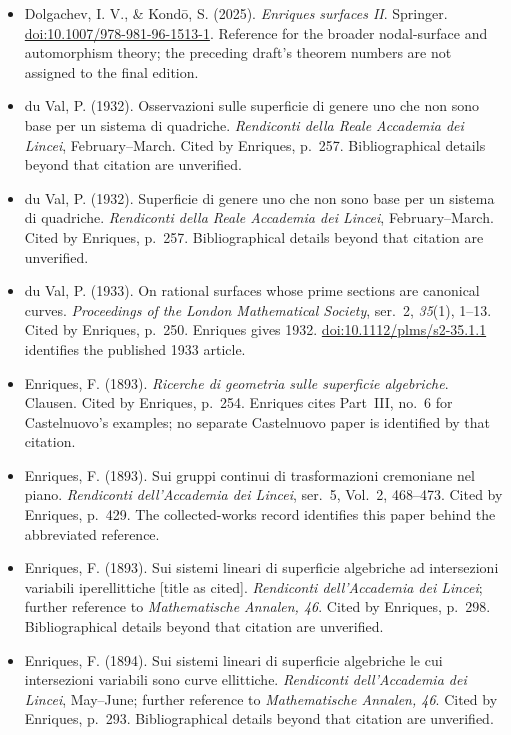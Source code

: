 \begin{sloppypar}
\begin{itemize}
\item Dolgachev, I. V., \& Kond\=o, S. (2025). \emph{Enriques surfaces II}. Springer. \href{https://doi.org/10.1007/978-981-96-1513-1}{doi:10.1007/978-981-96-1513-1}. Reference for the broader nodal-surface and automorphism theory; the preceding draft's theorem numbers are not assigned to the final edition.

\item du Val, P. (1932). Osservazioni sulle superficie di genere uno che non sono base per un sistema di quadriche. \emph{Rendiconti della Reale Accademia dei Lincei}, February--March. Cited by Enriques, p.~257. Bibliographical details beyond that citation are unverified.

\item du Val, P. (1932). Superficie di genere uno che non sono base per un sistema di quadriche. \emph{Rendiconti della Reale Accademia dei Lincei}, February--March. Cited by Enriques, p.~257. Bibliographical details beyond that citation are unverified.

\item du Val, P. (1933). On rational surfaces whose prime sections are canonical curves. \emph{Proceedings of the London Mathematical Society}, ser.~2, \emph{35}(1), 1--13. Cited by Enriques, p.~250. Enriques gives 1932. \href{https://doi.org/10.1112/plms/s2-35.1.1}{doi:10.1112/plms/s2-35.1.1} identifies the published 1933 article.

\item Enriques, F. (1893). \emph{Ricerche di geometria sulle superficie algebriche}. Clausen. Cited by Enriques, p.~254. Enriques cites Part~III, no.~6 for Castelnuovo's examples; no separate Castelnuovo paper is identified by that citation.

\item Enriques, F. (1893). Sui gruppi continui di trasformazioni cremoniane nel piano. \emph{Rendiconti dell'Accademia dei Lincei}, ser.~5, Vol.~2, 468--473. Cited by Enriques, p.~429. The collected-works record identifies this paper behind the abbreviated reference.

\item Enriques, F. (1893). Sui sistemi lineari di superficie algebriche ad intersezioni variabili iperellittiche [title as cited]. \emph{Rendiconti dell'Accademia dei Lincei}; further reference to \emph{Mathematische Annalen, 46}. Cited by Enriques, p.~298. Bibliographical details beyond that citation are unverified.

\item Enriques, F. (1894). Sui sistemi lineari di superficie algebriche le cui intersezioni variabili sono curve ellittiche. \emph{Rendiconti dell'Accademia dei Lincei}, May--June; further reference to \emph{Mathematische Annalen, 46}. Cited by Enriques, p.~293. Bibliographical details beyond that citation are unverified.


\end{itemize}
\end{sloppypar}

